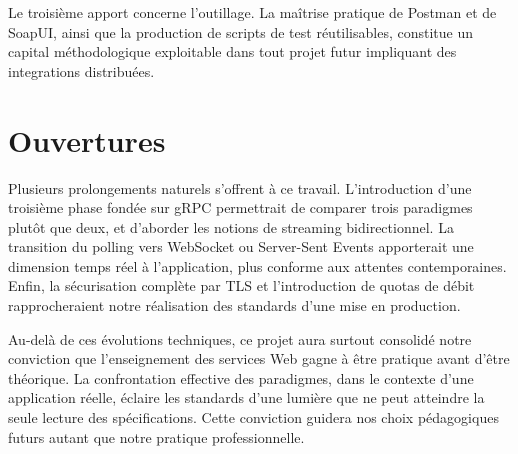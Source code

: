 Le troisième apport concerne l'outillage. La maîtrise pratique de Postman et de SoapUI, ainsi que la production de scripts de test réutilisables, constitue un capital méthodologique exploitable dans tout projet futur impliquant des integrations distribuées.

\section*{Ouvertures}

Plusieurs prolongements naturels s'offrent à ce travail. L'introduction d'une troisième phase fondée sur gRPC permettrait de comparer trois paradigmes plutôt que deux, et d'aborder les notions de streaming bidirectionnel. La transition du polling vers WebSocket ou Server-Sent Events apporterait une dimension temps réel à l'application, plus conforme aux attentes contemporaines. Enfin, la sécurisation complète par TLS et l'introduction de quotas de débit rapprocheraient notre réalisation des standards d'une mise en production.

Au-delà de ces évolutions techniques, ce projet aura surtout consolidé notre conviction que l'enseignement des services Web gagne à être pratique avant d'être théorique. La confrontation effective des paradigmes, dans le contexte d'une application réelle, éclaire les standards d'une lumière que ne peut atteindre la seule lecture des spécifications. Cette conviction guidera nos choix pédagogiques futurs autant que notre pratique professionnelle.
